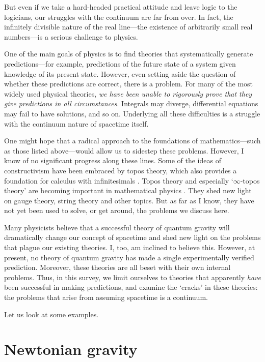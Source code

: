 \documentclass{article}
\begin{document}
But even if we take a hard-headed practical attitude and leave logic to the logicians, our struggles with the continuum are far from over.  In fact, the infinitely divisible nature of the real line---the 
existence of arbitrarily small real numbers---is a serious challenge to physics. 

One of the main goals of physics is to find theories that systematically generate
predictions---for example, predictions of the future state of a system given 
knowledge of its present state.   However, even setting aside the question of whether
these predictions are correct, there is a problem.  For many of the most widely used physical theories,  \emph{we have been unable to rigorously prove that they give
predictions in all circumstances}.  Integrals may diverge, differential equations may
fail to have solutions, and so on.   Underlying all these difficulties is a struggle with the continuum nature of spacetime itself.   

One might hope that a radical approach to the foundations of mathematics---such as those listed above---would allow us to sidestep these problems.  However, I know of no significant progress along these lines.  Some of the ideas of constructivism have been embraced by topos theory, which also provides a foundation for calculus with infinitesimals \cite{Kock1,Kock2}.  Topos theory and especially `$\infty$-topos theory' are becoming important in mathematical physics \cite{Schreiber}.  They shed new light on gauge theory, string theory and other topics.  But as far as I know, they have not yet been used to solve, or get around, the problems we discuss here.

Many physicists believe that a successful theory of quantum gravity will dramatically change our concept of spacetime and shed new light on the problems that plague our existing theories.   I, too, am inclined to believe this.   However, at present, no theory of quantum gravity has made a single experimentally verified prediction.  Moreover, these theories are all beset with their own internal problems.  Thus, in this survey, we limit ourselves to theories that apparently \emph{have} been successful in making predictions, and examine the `cracks' in these theories: the problems that arise from assuming spacetime is a continuum.

Let us look at some examples.  

\section{Newtonian gravity}
\label{newtonian}
\end{document}

